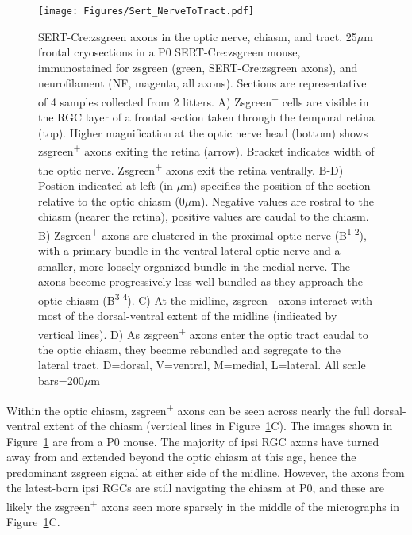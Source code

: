\begin{figure}[hbtp]
    \begin{center}
        \texttt{[image: Figures/Sert\_NerveToTract.pdf]}
        \caption[SERT-Cre:zsgreen axons in the optic nerve, chiasm, and tract.]
        {SERT-Cre:zsgreen axons in the optic nerve, chiasm, and tract.
        25$\mu$m frontal cryosections in a P0 SERT-Cre:zsgreen mouse, immunostained for zsgreen (green, SERT-Cre:zsgreen axons), and neurofilament (NF, magenta, all axons).
        Sections are representative of 4 samples collected from 2 litters. %
        A) Zsgreen\textsuperscript{+} cells are visible in the RGC layer of a frontal section taken through the temporal retina (top).
        Higher magnification at the optic nerve head (bottom) shows zsgreen\textsuperscript{+} axons exiting the retina (arrow).
        Bracket indicates width of the optic nerve.
		Zsgreen\textsuperscript{+} axons exit the retina ventrally.
        B-D) Postion indicated at left (in $\mu$m) specifies the position of the section relative to the optic chiasm (0$\mu$m).
        Negative values are rostral to the chiasm (nearer the retina), positive values are caudal to the chiasm.
        B) Zsgreen\textsuperscript{+} axons are clustered in the proximal optic nerve (B\textsuperscript{1-2}), with a primary bundle in the ventral-lateral optic nerve and a smaller, more loosely organized bundle in the medial nerve.
        The axons become progressively less well bundled as they approach the optic chiasm (B\textsuperscript{3-4}).
        C) At the midline, zsgreen\textsuperscript{+} axons interact with most of the dorsal-ventral extent of the midline (indicated by vertical lines).
        D) As zsgreen\textsuperscript{+} axons enter the optic tract caudal to the optic chiasm, they become rebundled and segregate to the lateral tract.
        D=dorsal, V=ventral, M=medial, L=lateral.
        All scale bars=200$\mu$m}
        \label{Figures/SertNerveToTract}
    \end{center}
\end{figure}

Within the optic chiasm, zsgreen\textsuperscript{+} axons can be seen across nearly the full dorsal-ventral extent of the chiasm (vertical lines in Figure~\ref{Figures/SertNerveToTract}C).
The images shown in Figure~\ref{Figures/SertNerveToTract} are from a P0 mouse.
The majority of ipsi RGC axons have turned away from and extended beyond the optic chiasm at this age, hence the predominant zsgreen signal at either side of the midline.
However, the axons from the latest-born ipsi RGCs are still navigating the chiasm at P0, and these are likely the zsgreen\textsuperscript{+} axons seen more sparsely in the middle of the micrographs in Figure~\ref{Figures/SertNerveToTract}C.

